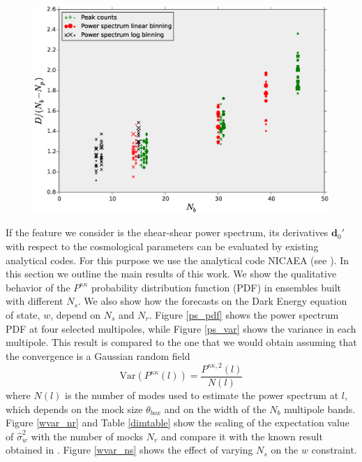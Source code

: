 \documentclass[reprint,aps,prd,superscriptaddress,showkeys,showpacs]{revtex4-1}
\newcommand{\bb}[1]{\mathbf{#1}}
\newcommand{\h}[1]{\hat{#1}}
\begin{document}
\begin{figure}
\includegraphics[scale=0.35]{Figures/effective_nb.eps}
\caption{}
\label{effectivenb}
\end{figure} 


If the feature we consider is the shear-shear power spectrum, its derivatives $\bb{d}_0'$ with respect to the cosmological parameters can be evaluated by existing analytical codes. For this purpose we use the analytical code NICAEA (see \citep{Nicaea}). In this section we outline the main results of this work. We show the qualitative behavior of the $P^{\kappa\kappa}$ probability distribution function (PDF) in ensembles built with different $N_s$. We also show how the forecasts on the Dark Energy equation of state, $w$, depend on $N_s$ and $N_r$. Figure \ref{ps_pdf} shows the power spectrum PDF at four selected multipoles, while Figure \ref{ps_var} shows the variance in each multipole. This result is compared to the one that we would obtain assuming that the convergence is a Gaussian random field
\begin{equation}
\label{gaussianvar}
\mathrm{Var}(P^{\kappa\kappa}(l)) = \frac{P^{\kappa\kappa,2}(l)}{N(l)}
\end{equation}
%
where $N(l)$ is the number of modes used to estimate the power spectrum at $l$, which depends on the mock size $\theta_{box}$ and on the width of the $N_b$ multipole bands. Figure \ref{wvar_nr} and Table \ref{dimtable} show the scaling of the expectation value of $\h{\sigma}_w^2$ with the number of mocks $N_r$ and compare it with the known result obtained in \citep{DodelsonSchneider13}. Figure \ref{wvar_ns} shows the effect of varying $N_s$ on the $w$ constraint.
\end{document}
